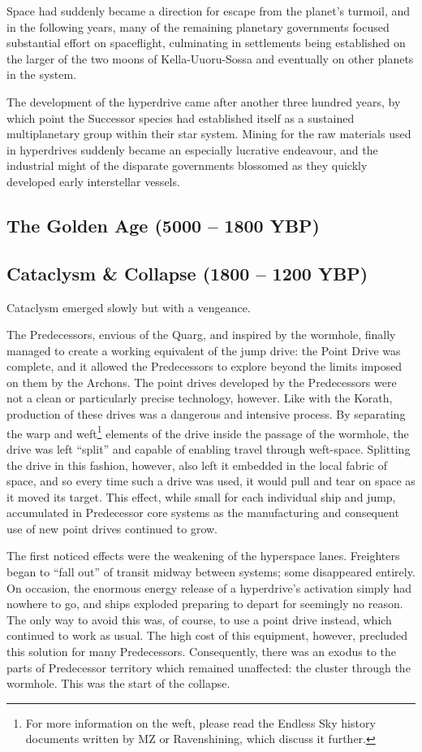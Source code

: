 \documentclass[11pt]{report}
\begin{document}
    Space had suddenly became a direction for escape from the planet's turmoil, and in the following years, many of the remaining planetary governments focused substantial effort on spaceflight, culminating in settlements being established on the larger of the two moons of Kella-Uuoru-Sossa and eventually on other planets in the system.

    The development of the hyperdrive came after another three hundred years, by which point the Successor species had established itself as a sustained multiplanetary group within their star system. Mining for the raw materials used in hyperdrives suddenly became an especially lucrative endeavour, and the industrial might of the disparate governments blossomed as they quickly developed early interstellar vessels.

    \subsection{The Golden Age (5000 -- 1800 YBP)}
    \subsection{Cataclysm \& Collapse (1800 -- 1200 YBP)}
    Cataclysm emerged slowly but with a vengeance. 

    The Predecessors, envious of the Quarg, and inspired by the wormhole, finally managed to create a working equivalent of the jump drive: the Point Drive was complete, and it allowed the Predecessors to explore beyond the limits imposed on them by the Archons. The point drives developed by the Predecessors were not a clean or particularly precise technology, however. Like with the Korath, production of these drives was a dangerous and intensive process. By separating the warp and weft\footnote[2]{For more information on the weft, please read the Endless Sky history documents written by MZ or Ravenshining, which discuss it further.} elements of the drive inside the passage of the wormhole, the drive was left ``split'' and capable of enabling travel through weft-space. Splitting the drive in this fashion, however, also left it embedded in the local fabric of space, and so every time such a drive was used, it would pull and tear on space as it moved its target. This effect, while small for each individual ship and jump, accumulated in Predecessor core systems as the manufacturing and consequent use of new point drives continued to grow.

    The first noticed effects were the weakening of the hyperspace lanes. Freighters began to ``fall out'' of transit midway between systems; some disappeared entirely. On occasion, the enormous energy release of a hyperdrive's activation simply had nowhere to go, and ships exploded preparing to depart for seemingly no reason. The only way to avoid this was, of course, to use a point drive instead, which continued to work as usual. The high cost of this equipment, however, precluded this solution for many Predecessors. Consequently, there was an exodus to the parts of Predecessor territory which remained unaffected: the cluster through the wormhole. This was the start of the collapse.
\end{document}
